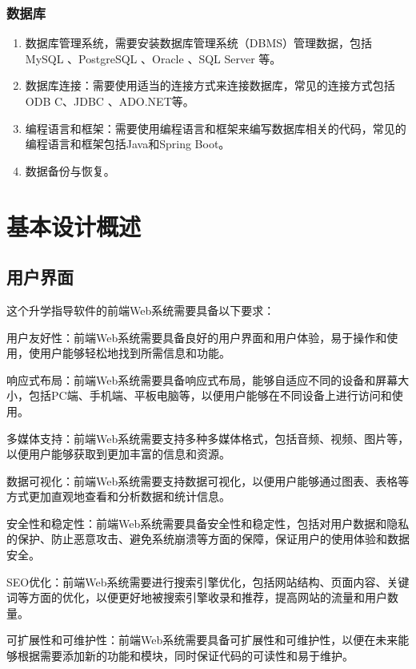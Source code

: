 \documentclass[UTF8]{ctexart}
\begin{document}
    \subsubsection{数据库}
    \begin{enumerate}
        \item 数据库管理系统，需要安装数据库管理系统（DBMS）管理数据，包括 MySQL 、PostgreSQL 、Oracle 、SQL Server 等。
        \item 数据库连接：需要使用适当的连接方式来连接数据库，常见的连接方式包括 ODB C、JDBC 、ADO.NET等。
        \item 编程语言和框架：需要使用编程语言和框架来编写数据库相关的代码，常见的编程语言和框架包括Java和Spring Boot。
        \item 数据备份与恢复。
    \end{enumerate}

    \section{基本设计概述}
    \subsection{用户界面}
    这个升学指导软件的前端Web系统需要具备以下要求：

    用户友好性：前端Web系统需要具备良好的用户界面和用户体验，易于操作和使用，使用户能够轻松地找到所需信息和功能。

    响应式布局：前端Web系统需要具备响应式布局，能够自适应不同的设备和屏幕大小，包括PC端、手机端、平板电脑等，以便用户能够在不同设备上进行访问和使用。

    多媒体支持：前端Web系统需要支持多种多媒体格式，包括音频、视频、图片等，以便用户能够获取到更加丰富的信息和资源。

    数据可视化：前端Web系统需要支持数据可视化，以便用户能够通过图表、表格等方式更加直观地查看和分析数据和统计信息。

    安全性和稳定性：前端Web系统需要具备安全性和稳定性，包括对用户数据和隐私的保护、防止恶意攻击、避免系统崩溃等方面的保障，保证用户的使用体验和数据安全。

    SEO优化：前端Web系统需要进行搜索引擎优化，包括网站结构、页面内容、关键词等方面的优化，以便更好地被搜索引擎收录和推荐，提高网站的流量和用户数量。

    可扩展性和可维护性：前端Web系统需要具备可扩展性和可维护性，以便在未来能够根据需要添加新的功能和模块，同时保证代码的可读性和易于维护。
\end{document}
